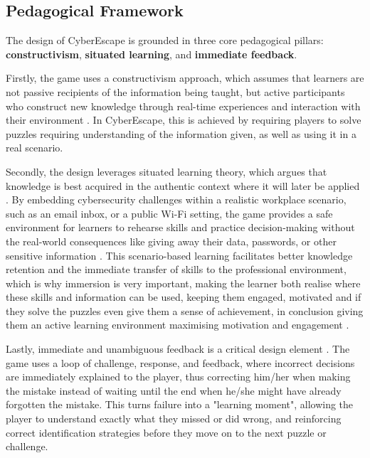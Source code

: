 \documentclass[sigconf, authorversion=true, nonacm=true]{acmart}%
\begin{document}
\subsection{Pedagogical Framework}

The design of CyberEscape is grounded in three core pedagogical pillars: \textbf{constructivism}, \textbf{situated learning}, and \textbf{immediate feedback}.

Firstly, the game uses a constructivism approach, which assumes that learners are not passive recipients of the information being taught, but active participants who construct new knowledge through real-time experiences and interaction with their environment \cite{makri_digital_2021, plass_handbook_2020, plass_foundations_2015}. In CyberEscape, this is achieved by requiring players to solve puzzles requiring understanding of the information given, as well as using it in a real scenario.


Secondly, the design leverages situated learning theory, which argues that knowledge is best acquired in the authentic context where it will later be applied \cite{plass_handbook_2020, plass_foundations_2015, veldkamp_escape_2020}. By embedding cybersecurity challenges within a realistic workplace scenario, such as an email inbox, or a public Wi-Fi setting, the game provides a safe environment for learners to rehearse skills and practice decision-making without the real-world consequences like giving away their data, passwords, or other sensitive information \cite{spatafora_educational_2024, moffett_building_2023}. This scenario-based learning facilitates better knowledge retention and the immediate transfer of skills to the professional environment, which is why immersion is very important, making the learner both realise where these skills and information can be used, keeping them engaged, motivated and if they solve the puzzles even give them a sense of achievement, in conclusion giving them an active learning environment maximising motivation and engagement \cite{makri_digital_2021}.


Lastly, immediate and unambiguous feedback is a critical design element \cite{veldkamp_escape_2020}. The game uses a loop of challenge, response, and feedback, where incorrect decisions are immediately explained to the player, thus correcting him/her when making the mistake instead of waiting until the end when he/she might have already forgotten the mistake. This turns failure into a "learning moment", allowing the player to understand exactly what they missed or did wrong, and reinforcing correct identification strategies before they move on to the next puzzle or challenge.
\end{document}
